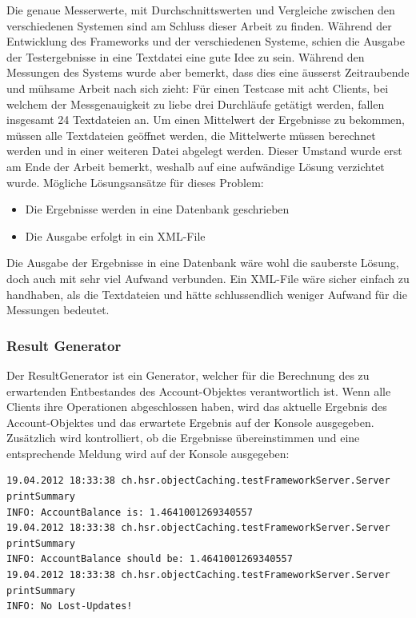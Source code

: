 Die genaue Messerwerte, mit Durch\-schnitts\-wer\-ten und Ver\-gleiche zwischen den verschiedenen Systemen sind am Schluss dieser Arbeit zu finden. \newline
Während der Entwicklung des Frameworks und der verschiedenen Systeme, schien die Ausgabe der Testergebnisse in eine Textdatei eine gute Idee zu sein. Während den Messungen des Systems wurde aber bemerkt, dass dies eine äusserst Zeitraubende und mühsame Arbeit nach sich zieht: Für einen Testcase mit acht Clients, bei welchem der Messgenauigkeit zu liebe drei Durchläufe getätigt werden, fallen insgesamt 24 Textdateien an. Um einen Mittelwert der Ergebnisse zu bekommen, müssen alle Textdateien geöffnet werden, die Mittelwerte müssen berechnet werden und in einer weiteren Datei abgelegt werden. \newline
Dieser Umstand wurde erst am Ende der Arbeit bemerkt, weshalb auf eine aufwändige Lösung verzichtet wurde. Mögliche Lösungsansätze für dieses Problem:
\begin{itemize}
\item Die Ergebnisse werden in eine Datenbank geschrieben
\item Die Ausgabe erfolgt in ein XML-File
\end{itemize}
Die Ausgabe der Ergebnisse in eine Datenbank wäre wohl die sauberste Lösung, doch auch mit sehr viel Aufwand verbunden. Ein XML-File wäre sicher einfach zu handhaben, als die Textdateien und hätte schlussendlich weniger Aufwand für die Messungen bedeutet.

\subsubsection{Result Generator}
\label{sec:resultGenerator}
Der ResultGenerator ist ein Generator, welcher für die Berechnung des zu erwartenden Entbestandes des Account-Objektes verantwortlich ist. Wenn alle Clients ihre Operationen abgeschlossen haben, wird das aktuelle Ergebnis des Account-Objektes und das erwartete Ergebnis auf der Konsole ausgegeben. Zusätzlich wird kontrolliert, ob die Ergebnisse übereinstimmen und eine entsprechende Meldung wird auf der Konsole ausgegeben:
\begin{lstlisting}[breaklines=true]
19.04.2012 18:33:38 ch.hsr.objectCaching.testFrameworkServer.Server printSummary
INFO: AccountBalance is: 1.4641001269340557
19.04.2012 18:33:38 ch.hsr.objectCaching.testFrameworkServer.Server printSummary
INFO: AccountBalance should be: 1.4641001269340557
19.04.2012 18:33:38 ch.hsr.objectCaching.testFrameworkServer.Server printSummary
INFO: No Lost-Updates!
\end{lstlisting}


